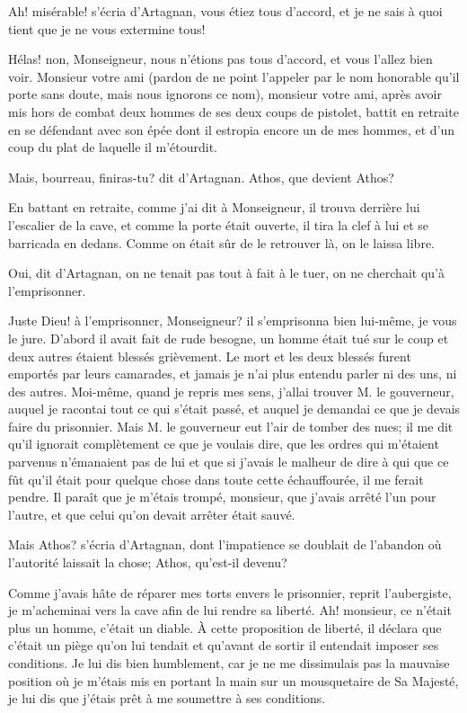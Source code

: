 \speak  Ah! misérable! s'écria d'Artagnan, vous étiez tous d'accord, et je ne sais à quoi tient que je ne vous extermine tous! 

\speak  Hélas! non, Monseigneur, nous n'étions pas tous d'accord, et vous l'allez bien voir. Monsieur votre ami (pardon de ne point l'appeler par le nom honorable qu'il porte sans doute, mais nous ignorons ce nom), monsieur votre ami, après avoir mis hors de combat deux hommes de ses deux coups de pistolet, battit en retraite en se défendant avec son épée dont il estropia encore un de mes hommes, et d'un coup du plat de laquelle il m'étourdit. 

\speak  Mais, bourreau, finiras-tu? dit d'Artagnan. Athos, que devient Athos? 

\speak  En battant en retraite, comme j'ai dit à Monseigneur, il trouva derrière lui l'escalier de la cave, et comme la porte était ouverte, il tira la clef à lui et se barricada en dedans. Comme on était sûr de le retrouver là, on le laissa libre. 

\speak  Oui, dit d'Artagnan, on ne tenait pas tout à fait à le tuer, on ne cherchait qu'à l'emprisonner. 

\speak  Juste Dieu! à l'emprisonner, Monseigneur? il s'emprisonna bien lui-même, je vous le jure. D'abord il avait fait de rude besogne, un homme était tué sur le coup et deux autres étaient blessés grièvement. Le mort et les deux blessés furent emportés par leurs camarades, et jamais je n'ai plus entendu parler ni des uns, ni des autres. Moi-même, quand je repris mes sens, j'allai trouver M. le gouverneur, auquel je racontai tout ce qui s'était passé, et auquel je demandai ce que je devais faire du prisonnier. Mais M. le gouverneur eut l'air de tomber des nues; il me dit qu'il ignorait complètement ce que je voulais dire, que les ordres qui m'étaient parvenus n'émanaient pas de lui et que si j'avais le malheur de dire à qui que ce fût qu'il était pour quelque chose dans toute cette échauffourée, il me ferait pendre. Il paraît que je m'étais trompé, monsieur, que j'avais arrêté l'un pour l'autre, et que celui qu'on devait arrêter était sauvé. 

\speak  Mais Athos? s'écria d'Artagnan, dont l'impatience se doublait de l'abandon où l'autorité laissait la chose; Athos, qu'est-il devenu? 

\speak  Comme j'avais hâte de réparer mes torts envers le prisonnier, reprit l'aubergiste, je m'acheminai vers la cave afin de lui rendre sa liberté. Ah! monsieur, ce n'était plus un homme, c'était un diable. À cette proposition de liberté, il déclara que c'était un piège qu'on lui tendait et qu'avant de sortir il entendait imposer ses conditions. Je lui dis bien humblement, car je ne me dissimulais pas la mauvaise position où je m'étais mis en portant la main sur un mousquetaire de Sa Majesté, je lui dis que j'étais prêt à me soumettre à ses conditions. 

